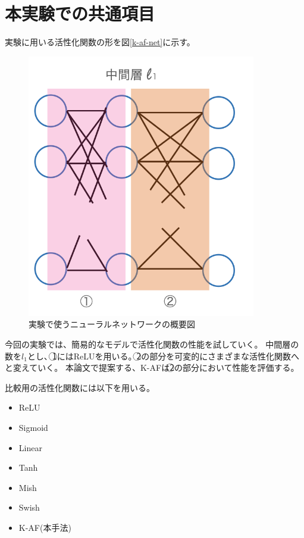 \vspace{-15mm} 
\section{本実験での共通項目}
\label{exp_common}

実験に用いる活性化関数の形を図\ref{k-af-net}に示す。
\begin{figure}[hbtp]
\label{k-af-net}
    \begin{center}
        \includegraphics[width=10cm]{asset/k-af-net.png}
            \caption{実験で使うニューラルネットワークの概要図}
            \label{neural_network1}
    \end{center}
\end{figure}

今回の実験では、簡易的なモデルで活性化関数の性能を試していく。
中間層の数を$ l_1 $とし、\textcircled{\scriptsize 1}にはReLUを用いる。\textcircled{\scriptsize 2}の部分を可変的にさまざまな活性化関数へと変えていく。
本論文で提案する、K-AFは\textcircled{\scriptsize 2}の部分において性能を評価する。

比較用の活性化関数には以下を用いる。
\begin{itemize}
\label{list:active}
    \setlength{\parskip}{0cm} %
    \setlength{\itemsep}{0cm} %
    \item ReLU
    \item Sigmoid
    \item Linear
    \item Tanh
    \item Mish
    \item Swish
    \item K-AF(本手法)
\end{itemize}


